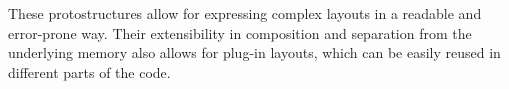 These protostructures allow for expressing complex layouts in a readable and error-prone way. Their extensibility in composition and separation from the underlying memory also allows for plug-in layouts, which can be easily reused in different parts of the code.




